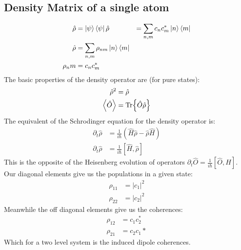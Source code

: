 \subsection{Density Matrix of a single atom}
\begin{align*}
	\hat{\rho} &= \ket{\psi}\bra{\psi}
	\hat{\rho} &= \sum_{n,m} c_n c_m ^* \ket{n}\bra{m} \\
	\hat{\rho} &= \sum_{n,m} \rho_{nm} \ket{n}\bra{m} \\
	\rho_nm &= c_n c_m^*
\end{align*}
The basic properties of the density operator are (for pure states):
\begin{align*}
	\hat{\rho}^2 &= \hat{\rho} \\
	\expval{\hat{O}} &= \Tr{\hat{O}\hat{\rho}}
\end{align*}
The equivalent of the Schrodinger equation for the density operator is:
\begin{align*}
	\partial_t \hat{\rho} &= \frac{1}{i\hbar} \left(\hat{H}\hat{\rho} - \hat{\rho}\hat{H}\right) \\
	\partial_t \hat{\rho} &= \frac{1}{i\hbar} [\hat{H},\hat{\rho}]
\end{align*}
This is the opposite of the Heisenberg evolution of operators $\partial_t \hat{O} = \frac{1}{i\hbar} [\hat{O},\hat{H}]$. Our diagonal elements give us the populations in a given state:
\begin{align*}
	\rho_{11} &= |c_1|^2 \\
	\rho_{22} &= |c_2|^2
\end{align*}
Meanwhile the off diagonal elements give us the coherences:
\begin{align*}
	\rho_{12} &= c_1 c_2^* \\
	\rho_{21} &= c_2 c_1*
\end{align*}
Which for a two level system is the induced dipole coherences.
